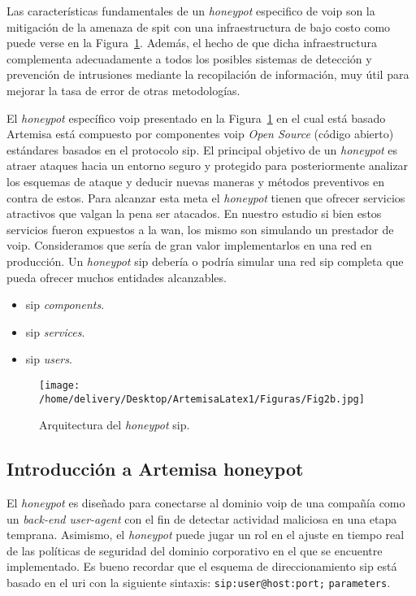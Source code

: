\documentclass[a4paper,12pt]{report}
\begin{document}
Las características fundamentales de un \emph{honeypot} especifico de \ac{voip} son la
mitigación de la amenaza de \ac{spit} con una infraestructura de bajo
costo como puede verse en la
Figura~\ref{arquitectura_honeypot_sip}. Además, el hecho de que dicha infraestructura
complementa adecuadamente a todos los posibles sistemas de detección y
prevención de intrusiones mediante la recopilación de información, muy útil para
mejorar la tasa de error de otras metodologías.

El \emph{honeypot} específico \ac{voip} presentado en la Figura~\ref{arquitectura_honeypot_sip} en el
cual está basado Artemisa está compuesto por componentes \ac{voip} \emph{Open Source}
(código abierto) estándares basados en el protocolo \ac{sip}. El principal objetivo
de un \emph{honeypot} es atraer ataques hacia un entorno seguro y protegido para
posteriormente analizar los esquemas de ataque y deducir nuevas maneras y
métodos preventivos en contra de estos. Para alcanzar esta meta el \emph{\mbox{honeypot}}
tienen que ofrecer servicios atractivos que valgan la pena ser atacados. En
nuestro estudio si bien estos servicios fueron expuestos a la \ac{wan}, los mismo
son simulando un prestador de \ac{voip}. Consideramos que sería de gran valor
implementarlos en una red en producción. Un \emph{\mbox{honeypot}} \ac{sip} debería o podría
simular una red \ac{sip} completa que pueda ofrecer muchos entidades
alcanzables. \cite{ewaldt}

\begin{itemize}
\item \ac{sip} \emph{components}.
\item \ac{sip} \emph{services}.
\item \ac{sip} \emph{users}.
\end{itemize}

\begin{figure}[h!] 
\centering
\texttt{[image: /home/delivery/Desktop/ArtemisaLatex1/Figuras/Fig2b.jpg]}
\caption{Arquitectura del \emph{honeypot} \ac{sip}. \cite{ewaldt}}
\label{arquitectura_honeypot_sip}
\end{figure}




\subsection{Introducción a Artemisa honeypot}
\label{intro_arte} 

El \emph{honeypot} es diseñado para conectarse al dominio \ac{voip} de una compañía como un
\emph{\mbox{back-end} \mbox{user-agent}} con el fin de
detectar actividad maliciosa en una etapa temprana. Asimismo, el \emph{\mbox{honeypot}} puede
jugar un rol en el ajuste en tiempo real de las políticas de seguridad del
dominio corporativo en el que se encuentre implementado.
Es bueno recordar que el esquema de direccionamiento \ac{sip} está basado en el
\ac{uri} con la siguiente sintaxis: \texttt{sip:user@host:port;}
\texttt{parameters}. 
\end{document}
